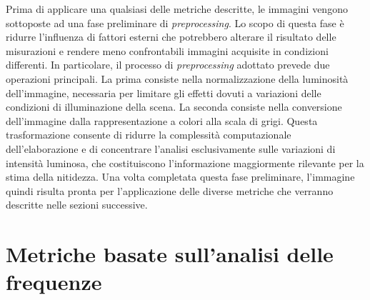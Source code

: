 \documentclass[
    target=bach,
    aauheader=,
    style=
]{thud}
\begin{document}
Prima di applicare una qualsiasi delle metriche descritte, le immagini vengono sottoposte ad una fase preliminare di \textit{preprocessing}. Lo scopo di questa fase è ridurre l'influenza di fattori esterni che potrebbero alterare il risultato delle misurazioni e rendere meno confrontabili immagini acquisite in condizioni differenti. In particolare, il processo di \textit{preprocessing} adottato prevede due operazioni principali. La prima consiste nella normalizzazione della luminosità dell'immagine, necessaria per limitare gli effetti dovuti a variazioni delle condizioni di illuminazione della scena. La seconda consiste nella conversione dell'immagine dalla rappresentazione a colori alla scala di grigi. Questa trasformazione consente di ridurre la complessità computazionale dell'elaborazione e di concentrare l'analisi esclusivamente sulle variazioni di intensità luminosa, che costituiscono l'informazione maggiormente rilevante per la stima della nitidezza. Una volta completata questa fase preliminare, l'immagine quindi risulta pronta per l'applicazione delle diverse metriche che verranno descritte nelle sezioni successive.

\section{Metriche basate sull'analisi delle frequenze}
\label{mbsadf}
\end{document}
